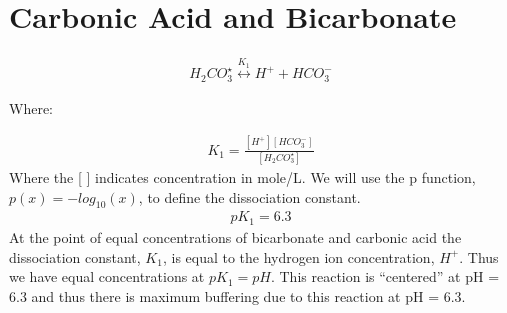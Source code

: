 \documentclass[letterpaper,10pt,english]{sphinxmanual}
\begin{document}
\section{Carbonic Acid and Bicarbonate}
\label{\detokenize{Rapid_Mix/RM_Examples:carbonic-acid-and-bicarbonate}}\label{\detokenize{Rapid_Mix/RM_Examples:heading-carbonic-acid-and-bicarbonate}}\begin{equation}\label{equation:Rapid_Mix/RM_Examples:carbonate}
\begin{split}{H_2}CO_3^{\star} \overset {K_1} \longleftrightarrow {H^+} + HCO_3^-\end{split}
\end{equation}\begin{description}
\item[{Where:}] \leavevmode
{}

\end{description}
\begin{equation}\label{equation:Rapid_Mix/RM_Examples:Rapid_Mix/RM_Examples:0}
\begin{split}{K_1} = \frac{{\left[ {{H^ + }} \right]\left[ {HCO_3^ - } \right]}}{{\left[ {{H_2}CO_3^{\star} } \right]}}\end{split}
\end{equation}
Where the {[} {]} indicates concentration in mole/L. We will use the p function, \(p(x)=-log_{10}(x)\), to define the dissociation constant.
\begin{equation}\label{equation:Rapid_Mix/RM_Examples:Rapid_Mix/RM_Examples:1}
\begin{split}p{K_1} = 6.3\end{split}
\end{equation}
At the point of equal concentrations of bicarbonate and carbonic acid the dissociation constant, \(K_1\), is equal to the hydrogen ion concentration, \(H^ +\). Thus we have equal concentrations at \(p{K_1} = pH\). This reaction is “centered” at pH = 6.3 and thus there is maximum buffering due to this reaction at pH = 6.3.
\end{document}
